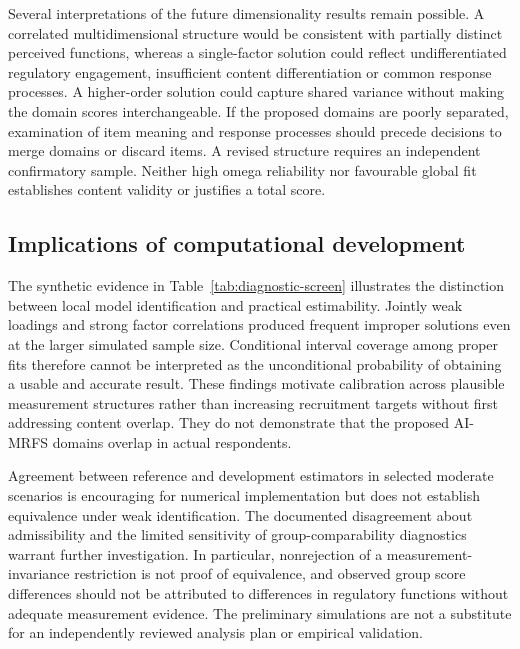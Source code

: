 \documentclass[11pt,a4paper]{article}
\begin{document}
Several interpretations of the future dimensionality results remain possible. A correlated multidimensional structure would be consistent with partially distinct perceived functions, whereas a single-factor solution could reflect undifferentiated regulatory engagement, insufficient content differentiation or common response processes. A higher-order solution could capture shared variance without making the domain scores interchangeable. If the proposed domains are poorly separated, examination of item meaning and response processes should precede decisions to merge domains or discard items. A revised structure requires an independent confirmatory sample. Neither high omega reliability nor favourable global fit establishes content validity or justifies a total score.

\subsection{Implications of computational development}
The synthetic evidence in Table~\ref{tab:diagnostic-screen} illustrates the distinction between local model identification and practical estimability. Jointly weak loadings and strong factor correlations produced frequent improper solutions even at the larger simulated sample size. Conditional interval coverage among proper fits therefore cannot be interpreted as the unconditional probability of obtaining a usable and accurate result. These findings motivate calibration across plausible measurement structures rather than increasing recruitment targets without first addressing content overlap. They do not demonstrate that the proposed AI-MRFS domains overlap in actual respondents.

Agreement between reference and development estimators in selected moderate scenarios is encouraging for numerical implementation but does not establish equivalence under weak identification. The documented disagreement about admissibility and the limited sensitivity of group-comparability diagnostics warrant further investigation. In particular, nonrejection of a measurement-invariance restriction is not proof of equivalence, and observed group score differences should not be attributed to differences in regulatory functions without adequate measurement evidence. The preliminary simulations are not a substitute for an independently reviewed analysis plan or empirical validation.
\end{document}
